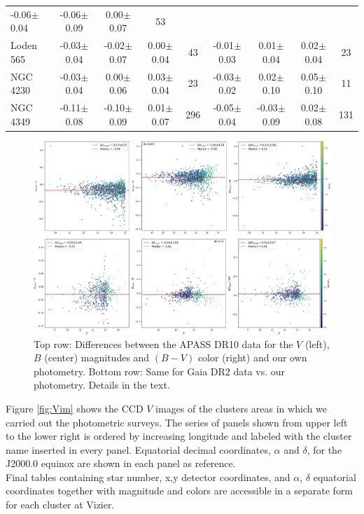 \documentclass[draft]{aa}
\begin{document}
\begin{table}[ht]
\begin{tabular}{lcccc|cccc}
-0.06$\pm$0.04 & -0.06$\pm$0.09 & 0.00$\pm$0.07 & 53\\
Loden 565 & -0.03$\pm$0.04 & -0.02$\pm$0.07 & 0.00$\pm$0.04 & 43 &
-0.01$\pm$0.03 & 0.01$\pm$0.04 & 0.02$\pm$0.04 & 23\\
NGC 4230  & -0.03$\pm$0.04 & 0.00$\pm$0.06 & 0.03$\pm$0.04 & 23 &
-0.03$\pm$0.02 & 0.02$\pm$0.10 & 0.05$\pm$0.10 & 11\\
NGC 4349  & -0.11$\pm$0.08 & -0.10$\pm$0.09 & 0.01$\pm$0.07 & 296 &
-0.05$\pm$0.04 & -0.03$\pm$0.09 & 0.02$\pm$0.08 & 131\\
    \hline
    \end{tabular}
    \label{tab:phot_diffs}
\end{table}

\begin{figure}[ht]
    \centering
     \includegraphics[width=\hsize]{../figs/apass_gaia_V_B_BV.png}   
\caption{Top row: Differences between the APASS DR10 data for the $V$
(left), $B$ (center) magnitudes and $(B-V)$ color (right) and our own
photometry. Bottom row: Same for Gaia DR2 data vs. our photometry. Details
in the text.}
    \label{fig:gaia_transf}
\end{figure}

Figure \ref{fig:Vim} shows the CCD $V$ images of the clusters areas in which we
carried out the photometric surveys. The series of panels shown from upper
left to the lower right is ordered by increasing longitude and labeled
with the cluster name inserted in every panel. Equatorial decimal
coordinates, $\alpha$ and $\delta$, for the J2000.0 equinox are shown in each
panel as reference.\\

Final tables containing star number, x,y detector coordinates, and $\alpha$,
$\delta$ equatorial coordinates together with magnitude and colors are
accessible in a separate form for each cluster at Vizier.
\end{document}
